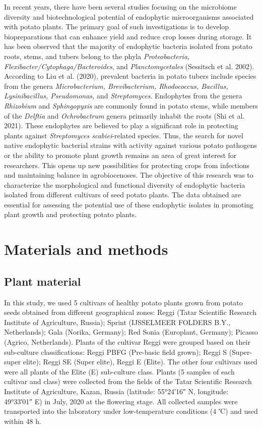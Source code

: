 \documentclass[sn-mathphys,Numbered]{sn-jnl}%
\theoremstyle{thmstyleone}%
\theoremstyle{thmstyletwo}%
\theoremstyle{thmstylethree}%
\begin{document}
In recent years, there have been several studies focusing on the microbiome diversity and biotechnological potential of endophytic microorganisms associated with potato plants. The primary goal of such investigations is to develop biopreparations that can enhance yield and reduce crop losses during storage. It has been observed that the majority of endophytic bacteria isolated from potato roots, stems, and tubers belong to the phyla \textit{Proteobacteria, Flexibacter/Cytophaga/Bacteroides}, and \textit{Planctomycetales} (Sessitsch et al. 2002). According to Liu et al.  (2020), prevalent bacteria in potato tubers include species from the genera \textit{Microbacterium, Brevibacterium, Rhodococcus, Bacillus, Lysinibacillus, Pseudomonas,} and \textit{Streptomyces}. Endophytes from the genera \textit{Rhizobium} and \textit{Sphingopyxis} are commonly found in potato stems, while members of the \textit{Delftia} and \textit{Ochrobactrum} genera primarily inhabit the roots (Shi et al. 2021). These endophytes are believed to play a significant role in protecting plants against \textit{Streptomyces scabiei}-related species. 
Thus, the search for novel native endophytic bacterial strains with activity against various potato pathogens or the ability to promote plant growth remains an area of great interest for researchers. This opens up new possibilities for protecting crops from infections and maintaining balance in agrobiocenoses.
The objective of this research was to characterize the morphological and functional diversity of endophytic bacteria isolated from different cultivars of seed potato plants. The data obtained are essential for assessing the potential use of these endophytic isolates in promoting plant growth and protecting potato plants.\\
\section*{Materials and methods}
\subsection*{Plant material}
In this study, we used 5 cultivars of healthy potato plants grown from potato seeds obtained from different geographical zones: Reggi (Tatar Scientific Research Institute of Agriculture, Russia); Sprint (IJSSELMEER FOLDERS B.Y., Netherlands); Gala (Norika, Germany); Red Sonia (Europlant, Germany); Picasso (Agrico, Netherlands). Plants of the cultivar Reggi were grouped based on their sub-culture classifications: Reggi PBFG (Pre-basic field grown); Reggi S (Super-super elite); Reggi SE (Super elite), Reggi E (Еlite). The other four cultivars used were all plants of the Elite (E) sub-culture class. Plants (5 samples of each cultivar and class) were collected from the fields of the Tatar Scientific Research Institute of Agriculture, Kazan, Russia (latitude: 55°24′16″ N, longitude: 49°33′01″ E) in July, 2020 at the flowering stage. 
All collected samples were transported into the laboratory under low-temperature conditions (4 ℃) and used within 48 h.
\end{document}

